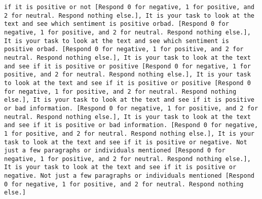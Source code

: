 \begin{lstlisting}[label=lst:poor_performing_prompts]
if it is positive or not [Respond 0 for negative, 1 for positive, and 2 for neutral. Respond nothing else.], It is your task to look at the text and see which sentiment is positive orbad. [Respond 0 for negative, 1 for positive, and 2 for neutral. Respond nothing else.], It is your task to look at the text and see which sentiment is positive orbad. [Respond 0 for negative, 1 for positive, and 2 for neutral. Respond nothing else.], It is your task to look at the text and see if it is positive or positive [Respond 0 for negative, 1 for positive, and 2 for neutral. Respond nothing else.], It is your task to look at the text and see if it is positive or positive [Respond 0 for negative, 1 for positive, and 2 for neutral. Respond nothing else.], It is your task to look at the text and see if it is positive or bad information. [Respond 0 for negative, 1 for positive, and 2 for neutral. Respond nothing else.], It is your task to look at the text and see if it is positive or bad information. [Respond 0 for negative, 1 for positive, and 2 for neutral. Respond nothing else.], It is your task to look at the text and see if it is positive or negative. Not just a few paragraphs or individuals mentioned [Respond 0 for negative, 1 for positive, and 2 for neutral. Respond nothing else.], It is your task to look at the text and see if it is positive or negative. Not just a few paragraphs or individuals mentioned [Respond 0 for negative, 1 for positive, and 2 for neutral. Respond nothing else.]

\end{lstlisting}
